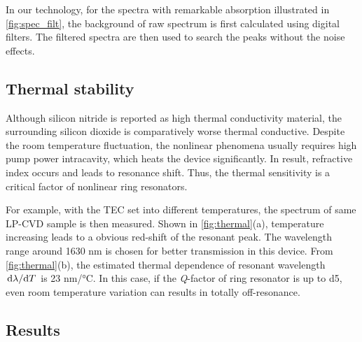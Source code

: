 \begin{figure}
	\centering
	
	\label{fig:spec_filt}
\end{figure}

In our technology, for the spectra with remarkable absorption illustrated in \autoref{fig:spec_filt}, the background of raw spectrum is first calculated using digital filters. The filtered spectra are then used to search the peaks without the noise effects.


\subsection{Thermal stability}

\begin{figure}
	\centering
	
	\label{fig:thermal}
\end{figure}

Although silicon nitride is reported as high thermal conductivity material, the surrounding silicon dioxide is comparatively worse thermal conductive. Despite the room temperature fluctuation, the nonlinear phenomena usually requires high pump power intracavity, which heats the device significantly. In result, refractive index occurs and leads to resonance shift. Thus, the thermal sensitivity is a critical factor of nonlinear ring resonators.

For example, with the TEC set into different temperatures, the spectrum of same LP-CVD sample is then measured. Shown in \autoref{fig:thermal}(a), temperature increasing leads to a obvious red-shift of the resonant peak. The wavelength range around 1630 nm is chosen for better transmission in this device. From \autoref{fig:thermal}(b), the estimated thermal dependence of resonant wavelength $\dv*{\lambda}{T}$ is 23 \si{\nm/\celsius}. In this case, if the \textit{Q}-factor of ring resonator is up to \num{d5}, even room temperature variation can results in totally off-resonance.

\subsection{Results}

